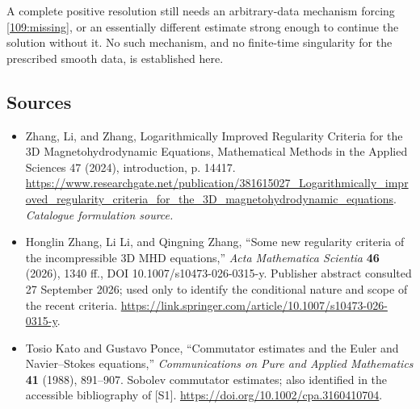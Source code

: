 \documentclass[11pt,a4paper]{article}
\numberwithin{equation}{section}
\begin{document}
A complete positive resolution still needs an arbitrary-data mechanism
forcing \eqref{109:missing}, or an essentially different estimate strong
enough to continue the solution without it. No such mechanism, and no
finite-time singularity for the prescribed smooth data, is established here.
\subsection{Sources}
\begin{itemize}\raggedright
\item[\textnormal{[S1]}]\hypertarget{source:109:1}{} Zhang, Li, and Zhang, Logarithmically Improved Regularity Criteria for the 3D Magnetohydrodynamic Equations, Mathematical Methods in the Applied Sciences 47 (2024), introduction, p. 14417.
\url{https://www.researchgate.net/publication/381615027_Logarithmically_improved_regularity_criteria_for_the_3D_magnetohydrodynamic_equations}.
{\small\textit{Catalogue formulation source.}}
\item[\textnormal{[E1]}]\hypertarget{extra:109:1}{}
Honglin Zhang, Li Li, and Qingning Zhang, ``Some new regularity criteria
of the incompressible 3D MHD equations,'' \emph{Acta Mathematica Scientia}
\textbf{46} (2026), 1340 ff., DOI 10.1007/s10473-026-0315-y.
Publisher abstract consulted 27 September 2026; used only to identify the
conditional nature and scope of the recent criteria.
\url{https://link.springer.com/article/10.1007/s10473-026-0315-y}.
\item[\textnormal{[E2]}]\hypertarget{extra:109:2}{}
Tosio Kato and Gustavo Ponce, ``Commutator estimates and the Euler and
Navier--Stokes equations,'' \emph{Communications on Pure and Applied
Mathematics} \textbf{41} (1988), 891--907. Sobolev commutator estimates;
also identified in the accessible bibliography of [S1].
\url{https://doi.org/10.1002/cpa.3160410704}.
\end{itemize}
\end{document}
